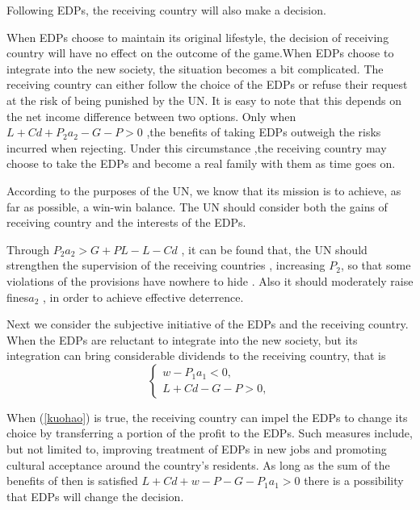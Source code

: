 \documentclass{mcmthesis}
\begin{document}
Following EDPs, the receiving country will also make a decision. 

When EDPs choose to maintain its original lifestyle, the decision of receiving country will have no effect on the outcome of the game.When EDPs choose to integrate into the new society, the situation becomes a bit complicated. The receiving country can either follow the choice of the EDPs or refuse their request at the risk of being punished by the UN. It is easy to note that this depends on the net income difference between two options. Only when$  L+Cd+P_{2}a_{2}-G-P>0 $ ,the benefits of taking EDPs outweigh the risks incurred when rejecting. Under this circumstance ,the receiving country may choose to take the EDPs and become a real family with them as time goes on.

According to the purposes of the UN, we know that its mission is to achieve, as far as possible, a win-win balance. The UN should consider both the gains of receiving country and the interests of the EDPs. 

Through $  P_{2}a_2>G+PL-L-Cd $ , it can be found that, the UN should strengthen the supervision of the receiving countries  , increasing $ P_{2} $, so that some violations of the provisions have nowhere to hide . Also it should moderately raise fines$ a_{2} $ , in order to achieve effective deterrence. 


Next we consider the subjective initiative of the EDPs and the receiving country. When the EDPs are reluctant to integrate into the new society, but its integration can bring considerable dividends to the receiving country, that is
\begin{equation}
\begin{cases} w-P_{1}a_{1}<0,\\
L+Cd-G-P>0,
\end{cases}\label{kuohao}
\end{equation}

When (\ref{kuohao}) is true, the receiving country can impel the EDPs to change its choice by transferring a portion of the profit to the EDPs. Such measures include, but not limited to, improving treatment of EDPs in new jobs and promoting cultural acceptance around the country's residents. As long as the sum of the benefits of then is satisfied $ L+Cd+w-P-G-P_{1}a_{1}>0 $ there is a possibility that EDPs will change the decision. 
\end{document}
